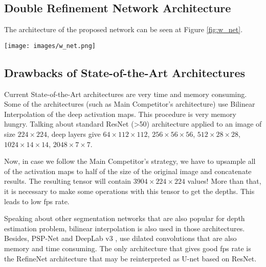 \documentclass[10pt,twocolumn,letterpaper]{article}
\begin{document}
\subsection{Double Refinement Network Architecture}

The architecture of the proposed network can be seen at Figure \ref{fig:w_net}.

\begin{figure*}
    \centering
    \texttt{[image: images/w\_net.png]}
    \caption{Double Refinement Network architecture. It contains one downsampling branch based on the backbone (yellow branch)
    and two upsampling branches(red and green branches). Red branch (\texttt{up I}) merges the high-level features together 
    with low-level features. The upsampling in it is done by Pixel Shuffle. 
    The green branch (\texttt{up II}) predicts only the Depth Map. In the right branch the upsampling is performed 
    by Bilinear Interpolation. The \texttt{up II} branch outputs a depth approximation 
    on each level, thus we can compute loss
    function on every level and force the high layers to learn as efficiently as low levels. The arrows that are marked with red color are referred to as diagonal connections in the text.}
    \label{fig:w_net}
\end{figure*}

\subsection{Drawbacks of State-of-the-Art Architectures}

Current State-of-the-Art architectures are very time and memory consuming.
Some of the architectures (such as Main Competitor's architecture) use Bilinear Interpolation
of the deep activation maps. This procedure is very memory hungry. Talking about standard
ResNet (\textgreater 50) architecture applied to an image of size $224 \times 224$, 
deep layers give $64 \times 112 \times 112$, $256 \times 56 \times 56$, 
$512 \times 28 \times 28$, $1024 \times 14 \times 14$, $2048 \times 7 \times 7$.

Now, in case we follow the Main Competitor's strategy, we have to upsample all of
the activation maps to half of the size of the original image and concatenate results.
The resulting tensor will contain $3904 \times 224 \times 224$ values! More than that,
it is necessary to make some operations with this tensor to get the depths. This
leads to low fps rate.

Speaking about other segmentation networks that are also popular for depth estimation
problem, bilinear interpolation is also used in those architectures. Besides, 
PSP-Net \cite{zhao2017pyramid} and DeepLab v3 \cite{chen2017rethinking}, \cite{chen2018encoder} 
use dilated convolutions that are also memory and time consuming.
The only architecture that gives good fps rate is the RefineNet architecture \cite{lin2017refinenet} that
may be reinterpreted as U-net based on ResNet.
\end{document}
